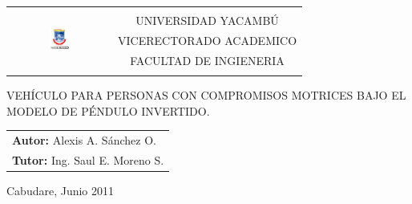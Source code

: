\documentclass[a4paper,10pt]{article}
\title{\Titulo}
\author{\Autor}
\newcommand{\Titulo}{VEHÍCULO PARA PERSONAS CON COMPROMISOS MOTRICES BAJO EL MODELO DE PÉNDULO INVERTIDO.}
\newcommand{\Autor}{Alexis A. Sánchez O.}
\begin{document}
\begin{tabular*}{0.8\textwidth}{@{\extracolsep{\fill}} cc }
  \multirow{6}{*}{\includegraphics[width=0.2\textwidth]{img/logouny.png}} 
  & \\
  & UNIVERSIDAD YACAMBÚ \\
  & VICERECTORADO ACADEMICO \\
  & FACULTAD DE INGIENERIA \\
  & \\
\end{tabular*}
\vspace{9cm}
\begin{center}
\Titulo\\
\end{center}
\vspace{9cm}
\raggedleft
\begin{tabular}{l}
\textbf{Autor:} \Autor \\
\textbf{Tutor:} Ing. Saul E. Moreno S. \\
\end{tabular}
\vspace{1cm}
\begin{center}
Cabudare, Junio 2011\\
\end{center}
\end{document}
